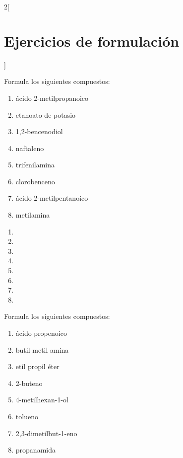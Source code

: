 \documentclass[10pt]{article}
\begin{document}
\begin{multicols}{2}[
  \section{Ejercicios de formulación}
  ]

\begin{exercise}[
    tags    = {orgánica,nomenclatura,múltiple,2B},
    topics  = {química orgánica,formulación,nomenclatura},
    source  = {Química 2B SAN 2016, p391, e17},
  ]
  Formula los siguientes compuestos:

  \begin{enumerate}
    \item ácido 2-metilpropanoico
    \item etanoato de potasio
    \item 1,2-bencenodiol
    \item naftaleno
    \item trifenilamina
    \item clorobenceno
    \item ácido 2-metilpentanoico
    \item metilamina
  \end{enumerate}
\end{exercise}

\begin{solution}
  \begin{enumerate}
    \item {}
    \item {}
    \item {}
    \item {}
    \item {}
    \item {}
    \item {}
    \item {}
  \end{enumerate}
\end{solution}


\begin{exercise}[
    tags    = {orgánica,nomenclatura,múltiple,2B},
    topics  = {química orgánica,formulación,nomenclatura},
    source  = {Química 2B SAN 2016, p391, e17},
  ]
  Formula los siguientes compuestos:

  \begin{enumerate}
    \item ácido propenoico
    \item butil metil amina
    \item etil propil éter
    \item 2-buteno
    \item 4-metilhexan-1-ol
    \item tolueno
    \item 2,3-dimetilbut-1-eno
    \item propanamida
  \end{enumerate}
\end{exercise}


\end{multicols}
\end{document}
